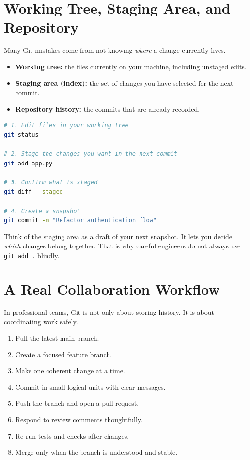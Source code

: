 \documentclass[12pt, a4paper, oneside]{book}
\begin{document}
\section{Working Tree, Staging Area, and Repository}

Many Git mistakes come from not knowing \emph{where} a change currently lives.

\begin{itemize}[leftmargin=2em]
    \item \textbf{Working tree:} the files currently on your machine, including unstaged edits.
    \item \textbf{Staging area (index):} the set of changes you have selected for the next commit.
    \item \textbf{Repository history:} the commits that are already recorded.
\end{itemize}

\begin{lstlisting}[language=bash, caption={How changes move through Git}]
# 1. Edit files in your working tree
git status

# 2. Stage the changes you want in the next commit
git add app.py

# 3. Confirm what is staged
git diff --staged

# 4. Create a snapshot
git commit -m "Refactor authentication flow"
\end{lstlisting}

\begin{intuitionbox}
Think of the staging area as a draft of your next snapshot. It lets you decide \emph{which} changes belong together. That is why careful engineers do not always use \texttt{git add .} blindly.
\end{intuitionbox}

\section{A Real Collaboration Workflow}

In professional teams, Git is not only about storing history. It is about coordinating work safely.

\begin{enumerate}[leftmargin=2em]
    \item Pull the latest main branch.
    \item Create a focused feature branch.
    \item Make one coherent change at a time.
    \item Commit in small logical units with clear messages.
    \item Push the branch and open a pull request.
    \item Respond to review comments thoughtfully.
    \item Re-run tests and checks after changes.
    \item Merge only when the branch is understood and stable.
\end{enumerate}
\end{document}
